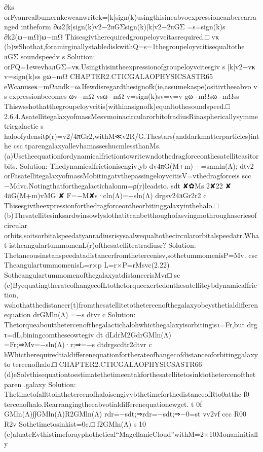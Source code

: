 {{∂ks
orFyanrealbumernkewcanwritek=|k|sign(k)usingthisineabvoexpressioncanberearranged
intheform
∂ω2|k|sign(k)v2−2πGΣsign(k)|k|v2−2πGΣ
=s=sign(k)s
∂k2(ω−mΩ)ω−mΩ
Thisesgivtherequiredgroupeloyvcitasrequired.□
vκ
(b)wShothat,foramirginallystablediskwithQ=s=1thegroupeloyvcitisequaltothe
πGΣ
soundspeedv
s
Solution:
orFQ=1ewevhaπGΣ=vκ.Usingthisintheexpressionofgroupeloyvcitesgiv
s
|k|v2−vκ
v=sign(k)ss
gω−mΩ
CHAPTER2.CTICGALAOPHYSICSASTR65
eWcanuseκ=mΩandk=ω.Ifewdisregardthesignofk(ie,assumekaspe)ositivtheeabvo
v
s
expressionbecomes
ωv−mΩ
vsω−mΩ
v=sign(k)sv=v=v
gω−mΩsω−mΩss
Thiswsshothatthegroupeloyvcitis(withinasignofk)equaltothesoundspeed.□
2.6.4.AsatellitegalaxyofmassMesvmoinacircularorbitofradiusRinasphericallysymmetricgalactic
s
haloofydensitρ(r)=v2/4πGr2,withM≪v2R/G.Thestars(anddarkmatterparticles)inthe
csc
tparengalaxyallevhamasseshucmlessthanMs.
(a)Usetheequationfordynamicalfrictiontowritewndothedragforceonthesatelliteasitorbits.
Solution:
Thedynamicalfrictionisengiv,yb
dv4πG(M+m)
−=snmln(Λ);
dtv2
orFasatellitegalaxyofmassMobitingatvthepassingeloyvcitisV=vthedragforceis
scc
−Mdvc.Notingthatforthegalactichalonm=ρ(r)leadsto.
sdt
✘✿Ms
2✘22
✘
4πG(M+m)vMG
✘
F=−M✘s·cln(Λ)=−sln(Λ)
drgsv24πGr2r2
c
Thisesgivtheexpressionforthedragforceontheorbitinggalaxyinthehalo.□
(b)Thesatellitesinksardwinsowlyslothatitcanbetthoughofasvingmothroughaseriesofcircular
orbits,soitsorbitalspeedatyanradiusrisysaalwequaltothecircularorbitalspeedatr.What
istheangulartummomenL(r)ofthesatelliteatradiusr?
Solution:
Thetaneousinstanspeedatadistancerfromthetercenisv,sothetummomenisP=Mv.
csc
TheangulartummomenisL=r×p
L=r×P=rMsvc(2.22)
SotheangulartummomenofthegalaxyatdistancerisMvr□
sc
(c)ByequatingtherateofhangecofLtothetorqueexertedonthesatelliteybdynamicalfriction,
wshothatthedistancer(t)fromthesatellitetothetercenofthegalaxyobeysthetialdifferen
equation
drGMln(Λ)
=−s
dtvr
c
Solution:
Thetorqueaboutthetercenofthegalactichalohwhicthegalaxyisorbitingisτ=Fr,but
drg
τ=dL,biningcomtheseowtegiv
dt
dLdrM2GdrGMln(Λ)
=Fr;⇒Mv=−sln(Λ)·r;⇒=−s
dtdrgscdtr2dtvr
c
hWhictherequiredtialdifferenequationfortherateofhangecofdistanceoforbitinggalaxyto
tercenofhalo.□
CHAPTER2.CTICGALAOPHYSICSASTR66
(d)eSolvthisequationtoestimatethetimeentakforthesatellitetosinktothetercenofthetparen
.galaxy
Solution:
ThetimetofallttointhetercenofhaloisengivybthetimeforthedistanceofRto0atthe
f0
tercenofhalo.Rearrangingtheeabvotialdifferenequationewget.
t
0f
GMln(Λ)∫∫GMln(Λ)R2GMln(Λ)
rdr=−sdt;⇒rdr=−sdt;⇒−0=st
vv2vf
ccc
R00
R2v
Sothetimetosinkist=0c.□
f2GMln(Λ)
s
10
(e)aluateEvthistimeforayphothetical“MagellanicCloud”withM=2×10Monaninitially
}}
